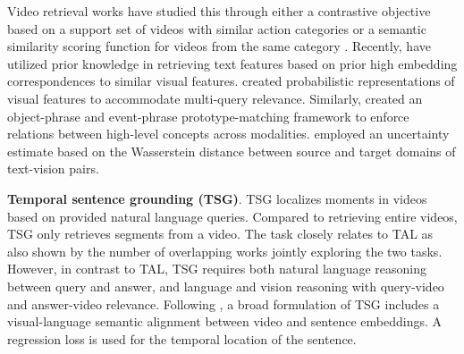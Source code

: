 

Video retrieval works have studied this through either a contrastive objective based on a support set of videos with similar action categories \citep{patrick2020support} or a semantic
similarity scoring function for videos from the same category \citep{wray2021semantic}. Recently, \citet{kim2024you} have utilized prior knowledge in retrieving text features based on prior high embedding correspondences to similar visual features. \citet{chun2021probabilistic} created probabilistic representations of visual features to accommodate multi-query relevance. Similarly, \citet{li2023progressive} created an object-phrase and event-phrase prototype-matching framework to enforce relations between high-level concepts across modalities. \citet{hao2024uncertainty} employed an uncertainty estimate based on the Wasserstein distance between source and target domains of text-vision pairs.




\noindent
\textbf{Temporal sentence grounding (TSG)}. TSG \citep{regneri2013grounding} localizes moments in videos based on provided natural language queries. Compared to retrieving entire videos, TSG only retrieves segments from a video. The task closely relates to TAL as also shown by the number of overlapping works \citep{gao2017tall} jointly exploring the two tasks. However, in contrast to TAL, TSG requires both natural language reasoning between query and answer, and language and vision reasoning with query-video and answer-video relevance. Following \citep{gao2017tall}, a broad formulation of TSG includes a visual-language semantic alignment between video and sentence embeddings. A regression loss is used for the temporal location of the sentence.


